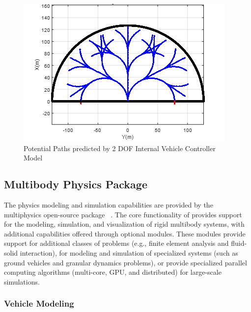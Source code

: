 \documentclass[12pt,twocolumn]{article}
\newcommand{\CHRONO}{{\sffamily{{Chrono}}}}
\begin{document}
\begin{figure}
	\centering
	\includegraphics[width=\columnwidth]{Figs/PathPossibilities.png}
	\caption{\small Potential Paths predicted by 2 DOF Internal Vehicle Controller Model}  
	\label{fig:PossiblePaths}
\end{figure}


\subsection{{\CHRONO} Multibody Physics Package}\label{ss:Chrono}

The physics modeling and simulation capabilities are provided by the multiphysics open-source package {\CHRONO}~\cite{Chrono2016}. The core functionality of {\CHRONO} provides support for the modeling, simulation, and visualization of rigid multibody systems, with additional capabilities offered through optional modules. These modules provide support for additional classes of problems (e.g., finite element analysis and fluid-solid interaction), for modeling and simulation of specialized systems (such as ground vehicles and granular dynamics problems), or provide specialized parallel computing algorithms (multi-core, GPU, and distributed) for large-scale simulations.



\subsubsection{Vehicle Modeling}\label{sss:Chrono_Vehicle}
	
\end{document}
